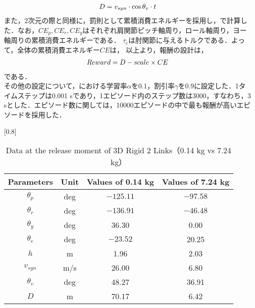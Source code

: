 \begin{small}
\begin{eqnarray}
  \equlabel{14}
  D = v_{syn} \cdot \cos\theta_{v} \cdot t
\end{eqnarray}
また，2次元の際と同様に，罰則として累積消費エネルギーを採用し，で計算した．なお，$CE_{p},CE_{r},CE_{y}$はそれぞれ肩関節ピッチ軸周り，ロール軸周り，ヨー軸周りの累積消費エネルギーである．
$\tau_{e}$は肘関節に与えるトルクである．よって，全体の累積消費エネルギー$CE$は，
以上より，報酬の設計は，
\begin{eqnarray}
  \equlabel{15}
  Reward = D - scale \times CE
\end{eqnarray}
である．\\
その他の設定について，における学習率$\alpha$を0.1，割引率$\gamma$を0.9に設定した．1タイムステップは0.001 sであり，1エピソード内のステップ数は3000，すなわち，3 sとした．エピソード数に関しては，10000エピソードの中で最も報酬が高いエピソードを採用した．
\begin{table}[t]
  \begin{center}
    \caption{Data at the release moment of 3D Rigid 2 Links（0.14 kg vs 7.24 kg）}
    \scalebox{0.8}[0.8]{
    \begin{tabular}{c|c|c|c}
      \hline
      Parameters & Unit & Values of 0.14 kg & Values of 7.24 kg \\
      \hline
      $\theta_{p}$ & deg & $-125.11$ & $-97.58$ \\
      $\theta_{r}$ & deg & $-136.91$ & $-46.48$ \\
      $\theta_{y}$ & deg  & 36.30 & 0.00 \\
      $\theta_{e}$ & deg & $-23.52$ & 20.25 \\
      $h$ & m & 1.96 & 2.03 \\
      $v_{syn}$ & m/s & 26.00 & 6.80 \\
      $\theta_{v}$ & deg & 48.27 & 36.91 \\
      $D$ & m & 70.17 & 6.42 \\
      \hline
    \end{tabular}
    }
  \end{center}
\end{table}

\end{small}

